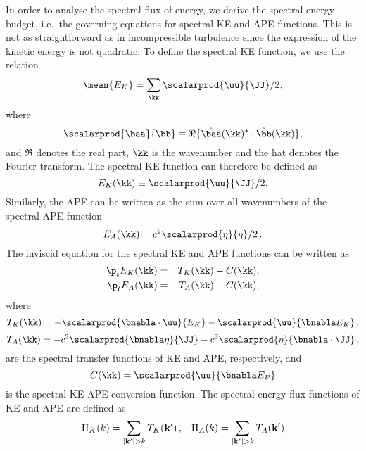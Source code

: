 In order to analyse the spectral flux of energy, we derive the spectral energy
budget, i.e.\ the governing equations for spectral KE and APE
functions. This is not as straightforward as in incompressible turbulence since
the expression of the kinetic energy  is not
quadratic. To define the spectral KE function, we use the relation
\begin{equation}
\mean { E_K } = \sum_\kk \scalarprod{\uu}{\JJ}/2,
\end{equation}
where
\begin{equation}
\scalarprod{\baa}{\bb} \equiv \Re\{ \hat \baa(\kk)^* \cdot \hat \bb(\kk) \},
\end{equation}
and $\Re$ denotes the real part, $\kk$ is the wavenumber and the
hat denotes the Fourier transform.
%
The spectral KE function can therefore be defined as
\begin{equation}
E_K(\kk) \equiv \scalarprod{\uu}{\JJ}/2.
\end{equation}
Similarly, the APE can be written as the sum over all wavenumbers of
the spectral APE function
\begin{equation}
E_A(\kk) =  c^2 \scalarprod{\eta}{\eta}/2 \, .
\end{equation}
The inviscid equation for the spectral KE and APE functions can be written as
\begin{eqnarray}
\p_t E_K(\kk) &=& T_K(\kk) - C (\kk),\\
\p_t E_A(\kk) &=& T_A(\kk) + C (\kk),
\end{eqnarray}
where
\begin{equation}
T_K(\kk)
= -\scalarprod{\bnabla \cdot \uu}{E_K}
-\scalarprod{\uu }{\bnabla E_K } \, ,
\end{equation}
\begin{equation}
T_A(\kk) = -c^2 \scalarprod{\bnabla \eta }{\JJ}- c^2\scalarprod{\eta}{\bnabla \cdot \JJ}  \, ,
\end{equation}
are the spectral transfer functions of KE and APE, respectively, and
\begin{equation}
C (\kk)
= \scalarprod{\uu}{\bnabla E_P}
\end{equation}
is the spectral KE-APE conversion function.
The spectral energy flux functions of KE and APE are defined as
\begin{eqnarray}
\Pi_K (k) = \sum_{| {\bf k}^{\prime} | > k} T_K ( {\bf k}^\prime ) \, , \;\;\;  \Pi_A (k) = \sum_{| {\bf k}^{\prime} | > k} T_A ( {\bf k}^\prime )
\end{eqnarray}


